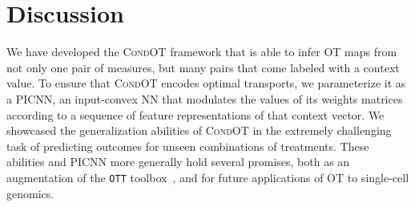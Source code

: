 \section{Discussion}
We have developed the \textsc{CondOT} framework that is able to infer OT maps from not only one pair of measures, but many pairs that come labeled with a context value. To ensure that \textsc{CondOT} encodes optimal transports, we parameterize it as a PICNN, an input-convex NN that modulates the values of its weights matrices according to a sequence of feature representations of that context vector. We showcased the generalization abilities of \textsc{CondOT} in the extremely challenging task of predicting outcomes for unseen combinations of treatments. These abilities and PICNN more generally hold several promises, both as an augmentation of the \texttt{OTT} toolbox~\citep{cuturi2022optimal}, and for future applications of OT to single-cell genomics.